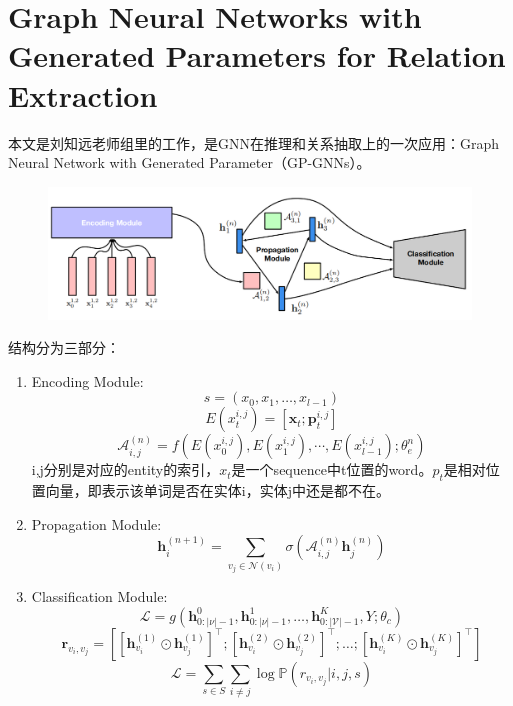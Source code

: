 \documentclass[a4paper,UTF8]{article}
\numberwithin{equation}{section}
\begin{document}
\section{Graph Neural Networks with Generated Parameters for Relation Extraction}
本文是刘知远老师组里的工作，是GNN在推理和关系抽取上的一次应用：Graph Neural Network with Generated Parameter（GP-GNNs）。
\begin{figure}[H]
	\centering
	\includegraphics[width=\textwidth]{5-1.png}
\end{figure}
结构分为三部分：
\begin{enumerate}
	\item Encoding Module:\\
	\begin{equation}
		s=\left(x_{0}, x_{1}, \ldots, x_{l-1}\right)
		\end{equation}
		\begin{equation}
			E\left(x_{t}^{i, j}\right)=\left[\boldsymbol{x}_{t} ; \boldsymbol{p}_{t}^{i, j}\right]
			\end{equation}
			\begin{equation}
				\mathcal{A}_{i, j}^{(n)}=f\left(E\left(x_{0}^{i, j}\right), E\left(x_{1}^{i, j}\right), \cdots, E\left(x_{l-1}^{i, j}\right) ; \theta_{e}^{n}\right)
				\end{equation}
	i,j分别是对应的entity的索引，$x_t$是一个sequence中t位置的word。$p_t$是相对位置向量，即表示该单词是否在实体i，实体j中还是都不在。
	\item Propagation Module:\\
	\begin{equation}
		\mathbf{h}_{i}^{(n+1)}=\sum_{v_{j} \in \mathcal{N}\left(v_{i}\right)} \sigma\left(\mathcal{A}_{i, j}^{(n)} \mathbf{h}_{j}^{(n)}\right)
		\end{equation}
	\item Classification Module:\\
	\begin{equation}
		\mathcal{L}=g\left(\mathbf{h}_{0 :|\nu|-1}^{0}, \mathbf{h}_{0 :|\nu|-1}^{1}, \ldots, \mathbf{h}_{0 :|\mathcal{V}|-1}^{K}, Y ; \theta_{c}\right)
		\end{equation}
		\begin{equation}
			\boldsymbol{r}_{v_{i}, v_{j}}=\left[\left[\boldsymbol{h}_{v_{i}}^{(1)} \odot \boldsymbol{h}_{v_{j}}^{(1)}\right]^{\top} ;\left[\boldsymbol{h}_{v_{i}}^{(2)} \odot \boldsymbol{h}_{v_{j}}^{(2)}\right]^{\top} ; \ldots ;\left[\boldsymbol{h}_{v_{i}}^{(K)} \odot \boldsymbol{h}_{v_{j}}^{(K)}\right]^{\top}\right]
			\end{equation}
			\begin{equation}
				\mathcal{L}=\sum_{s \in S} \sum_{i \neq j} \log \mathbb{P}\left(r_{v_{i}, v_{j}} | i, j, s\right)
				\end{equation}
\end{enumerate}
\end{document}
